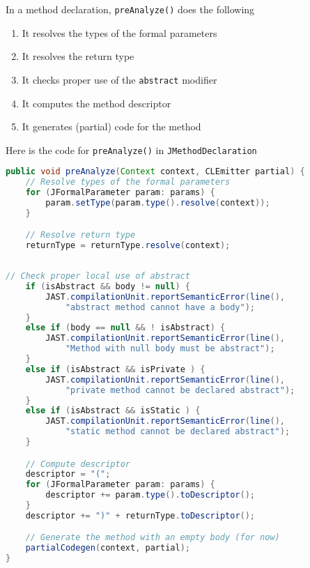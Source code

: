 \documentclass[8pt,a4paper,compress]{beamer}
\begin{document}
\begin{frame}[fragile]
\pause

In a method declaration, \lstinline{preAnalyze()} does the following
\begin{enumerate}
\item It resolves the types of the formal parameters
\item It resolves the return type
\item It checks proper use of the \lstinline{abstract} modifier
\item It computes the method descriptor
\item It generates (partial) code for the method
\end{enumerate}

\pause
\bigskip

Here is the code for \lstinline{preAnalyze()} in \lstinline{JMethodDeclaration}
\begin{lstlisting}[language=Java]
public void preAnalyze(Context context, CLEmitter partial) {
    // Resolve types of the formal parameters
    for (JFormalParameter param: params) {
        param.setType(param.type().resolve(context));
    }

    // Resolve return type
    returnType = returnType.resolve(context);
    
\end{lstlisting}
\end{frame}

\begin{frame}[fragile]
\pause

\begin{lstlisting}[language=Java]
    // Check proper local use of abstract
    if (isAbstract && body != null) {
        JAST.compilationUnit.reportSemanticError(line(),
            "abstract method cannot have a body");
    }
    else if (body == null && ! isAbstract) {
        JAST.compilationUnit.reportSemanticError(line(),
            "Method with null body must be abstract");
    }
    else if (isAbstract && isPrivate ) {
        JAST.compilationUnit.reportSemanticError(line(),
            "private method cannot be declared abstract");
    }
    else if (isAbstract && isStatic ) {
        JAST.compilationUnit.reportSemanticError(line(),
            "static method cannot be declared abstract");
    }

    // Compute descriptor
    descriptor = "(";
    for (JFormalParameter param: params) {
        descriptor += param.type().toDescriptor();
    }
    descriptor += ")" + returnType.toDescriptor();

    // Generate the method with an empty body (for now)
    partialCodegen(context, partial);
}
\end{lstlisting}
\end{frame}
\end{document}
